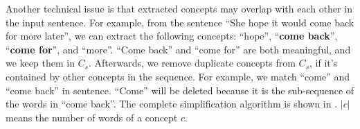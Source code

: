 Another technical issue is that extracted concepts may overlap with 
each other in the input sentence. For example, from the sentence 
``She hope it would come back for more later'', we can extract the following
concepts: ``hope'', ``\textbf{come back}'', ``\textbf{come for}'', 
and ``more''. ``Come back'' and ``come for'' are both meaningful, and we keep 
them in $C_s$.
Afterwards, we remove duplicate concepts from $C_s$,
if it's contained by other concepts in the sequence. 
For example, we match ``come'' and ``come back'' in sentence. 
``Come'' will be deleted because it is the sub-sequence of the words in ``come back''. 
The complete simplification
algorithm is shown in . $|c|$ means the number of words
of a concept $c$.





